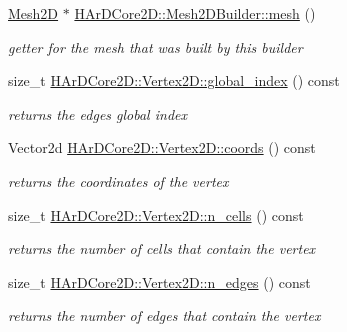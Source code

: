 \begin{DoxyCompactItemize}
\mbox{\label{group__Mesh2D_ga1114eb09e456abb04ab7b5f2c98b958e}} 
\hyperlink{classHArDCore2D_1_1Mesh2D}{Mesh2D} $\ast$ \hyperlink{group__Mesh2D_ga1114eb09e456abb04ab7b5f2c98b958e}{H\+Ar\+D\+Core2\+D\+::\+Mesh2\+D\+Builder\+::mesh} ()
\begin{DoxyCompactList}\small\item\em getter for the mesh that was built by this builder \end{DoxyCompactList}\item 
\mbox{\label{group__Mesh2D_ga916ae3bd5ae5fe6e79554ef216c72382}} 
size\+\_\+t \hyperlink{group__Mesh2D_ga916ae3bd5ae5fe6e79554ef216c72382}{H\+Ar\+D\+Core2\+D\+::\+Vertex2\+D\+::global\+\_\+index} () const
\begin{DoxyCompactList}\small\item\em returns the edges global index \end{DoxyCompactList}\item 
\mbox{\label{group__Mesh2D_gaa4022dfbf307b635bd6e57a942ab336e}} 
Vector2d \hyperlink{group__Mesh2D_gaa4022dfbf307b635bd6e57a942ab336e}{H\+Ar\+D\+Core2\+D\+::\+Vertex2\+D\+::coords} () const
\begin{DoxyCompactList}\small\item\em returns the coordinates of the vertex \end{DoxyCompactList}\item 
\mbox{\label{group__Mesh2D_ga6404e2ae17101be9b659503633913cf0}} 
size\+\_\+t \hyperlink{group__Mesh2D_ga6404e2ae17101be9b659503633913cf0}{H\+Ar\+D\+Core2\+D\+::\+Vertex2\+D\+::n\+\_\+cells} () const
\begin{DoxyCompactList}\small\item\em returns the number of cells that contain the vertex \end{DoxyCompactList}\item 
\mbox{\label{group__Mesh2D_gafa640a776dbd344dfcc9fc50bba0ef9a}} 
size\+\_\+t \hyperlink{group__Mesh2D_gafa640a776dbd344dfcc9fc50bba0ef9a}{H\+Ar\+D\+Core2\+D\+::\+Vertex2\+D\+::n\+\_\+edges} () const
\begin{DoxyCompactList}\small\item\em returns the number of edges that contain the vertex \end{DoxyCompactList}\item 

\end{DoxyCompactItemize}
